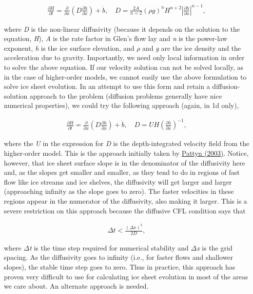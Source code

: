 \begin{align*}
\frac{\partial H}{\partial t}=\frac{\partial }{\partial x}\left( D\frac{\partial h}{\partial x} \right)+\dot{b},\quad D=\frac{2A}{n=2}\left( \rho g \right)^{n}H^{n+2}\left| \frac{\partial h}{\partial x} \right|^{n-1},
\end{align*}

where \textit{D} is the non-linear diffusivity (because it depends on the solution to the equation, \textit{H}), \textit{A} is the rate factor in Glen's flow lay and \textit{n} is the power-law exponent, \textit{h} is the ice surface elevation, and \textit{\(\rho{}\)} and \textit{g} are the ice density and the acceleration due to gravity. Importantly, we need only local information in order to solve the above equation. If our velocity solution can not be solved locally, as in the case of higher-order models, we cannot easily use the above formulation to solve ice sheet evolution. In an attempt to use this form and retain a diffusion-solution approach to the problem (diffusion problems generally have nice numerical properties), we could try the following approach (again, in 1d only),

\begin{align*}
\frac{\partial H}{\partial t}=\frac{\partial }{\partial x}\left( D\frac{\partial h}{\partial x} \right)+\dot{b},\quad D=UH\left( \frac{\partial h}{\partial x} \right)^{-1},
\end{align*}

where the \textit{U} in the expression for \textit{D} is the depth-integrated velocity field from the higher-order model. This is the approach initially taken by \href{http://www.agu.org/journals/jb/jb0308/2002JB002329/}{Pattyn (2003)}. Notice, however, that ice sheet surface slope is in the denominator of the diffusivity here and, as the slopes get smaller and smaller, as they tend to do in regions of fast flow like ice streams and ice shelves, the diffusivity will get larger and larger (approaching infinity as the slope goes to zero). The faster velocities in these regions appear in the numerator of the diffusivity, also making it larger. This is a severe restriction on this approach because the diffusive CFL condition says that

\begin{align*}
\Delta t<\frac{\left( \Delta x \right)^{2}}{2D},
\end{align*}

where \textit{\(\Delta{}\)t} is the time step required for numerical stability and \textit{\(\Delta{}\)x} is the grid spacing. As the diffusivity goes to infinity (i.e., for faster flows and shallower slopes), the stable time step goes to zero. Thus in practice, this approach has proven very difficult to use for calculating ice sheet evolution in most of the areas we care about. An alternate approach is needed.

